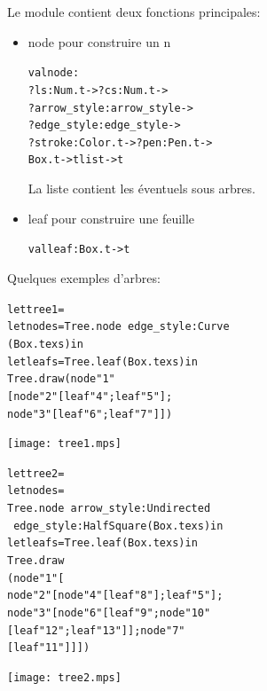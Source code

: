 \documentclass[a4paper,12pt]{article}
\begin{document}
Le module contient deux fonctions principales:
\begin{itemize}
\item node pour construire un n\oeud
  \begin{alltt}
    val node : 
    ?ls:Num.t -> ?cs:Num.t -> 
    ?arrow_style:arrow_style -> 
    ?edge_style:edge_style -> 
    ?stroke:Color.t -> ?pen:Pen.t ->
    Box.t -> t list -> t
  \end{alltt}
  La liste contient les éventuels sous arbres.
\bigskip 

\item leaf pour construire une feuille
  \begin{alltt}
    val leaf : Box.t -> t
  \end{alltt}
\end{itemize}

Quelques exemples d'arbres:

\bigskip

\begin{minipage}{0.5\linewidth}
  \begin{alltt}
    let tree1 =
    let node s = Tree.node ~edge_style:Curve 
    (Box.tex s) in
    let leaf s = Tree.leaf (Box.tex s) in
    Tree.draw (node "1" 
    [node "2" [leaf "4"; leaf "5"]; 
      node "3" [leaf "6"; leaf "7"]])
  \end{alltt}
\end{minipage}
\begin{minipage}{0.5\linewidth}
  \begin{center}
    \texttt{[image: tree1.mps]}
  \end{center}
\end{minipage}

\bigskip

\begin{minipage}{0.5\linewidth}
  \begin{alltt}
    let tree2 =
    let node s = 
    Tree.node ~arrow_style:Undirected 
    ~edge_style:HalfSquare (Box.tex s) in
    let leaf s = Tree.leaf (Box.tex s) in
    Tree.draw 
    (node "1" [
      node "2" [node "4" [leaf "8"]; leaf "5"]; 
      node "3" [node "6" [leaf "9"; node "10" 
          [leaf "12"; leaf "13"]];node "7" 
        [leaf "11"]]])
  \end{alltt}
\end{minipage}
\begin{minipage}{0.5\linewidth}
  \begin{center}
    \texttt{[image: tree2.mps]}
  \end{center}
\end{minipage}
\end{document}
